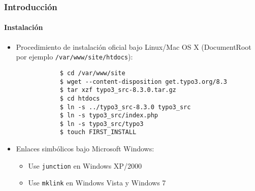 \begin{frame}[fragile]
	\frametitle{Introducción}
	\framesubtitle{Instalación}

	\begin{itemize}
		\item Procedimiento de instalación oficial bajo Linux/Mac OS X\newline
			(DocumentRoot por ejemplo \texttt{/var/www/site/htdocs}):
		\begin{lstlisting}
			$ cd /var/www/site
			$ wget --content-disposition get.typo3.org/8.3
			$ tar xzf typo3_src-8.3.0.tar.gz
			$ cd htdocs
			$ ln -s ../typo3_src-8.3.0 typo3_src
			$ ln -s typo3_src/index.php
			$ ln -s typo3_src/typo3
			$ touch FIRST_INSTALL
		\end{lstlisting}

		\item Enlaces simbólicos bajo Microsoft Windows:

			\begin{itemize}
				\item Use \texttt{junction} en Windows XP/2000
				\item Use \texttt{mklink} en Windows Vista y Windows 7
			\end{itemize}

	\end{itemize}
\end{frame}


